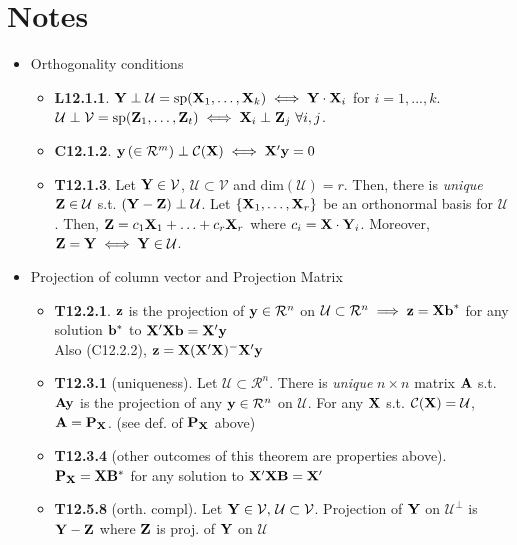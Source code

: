 \documentclass[a4paper, oneside]{book}
\begin{document}
\section*{Notes}
\begin{itemize}
\item Orthogonality conditions
	\begin{itemize}
	\item \textbf{L12.1.1}. $\mathbf{Y}\perp\mathcal{U}=\text{sp}(\mathbf{X}_1,\hdots,\mathbf{X}_k) \iff \mathbf{Y\cdot X}_i$ for $i=1,...,k$. $\mathcal{U\perp V}=\text{sp}(\mathbf{Z}_1,\hdots,\mathbf{Z}_t) \iff \mathbf{X}_i \perp \mathbf{Z}_j \,\,\forall i,j$.
	\item \textbf{C12.1.2}. $\mathbf{y}\, (\in \mathcal{R}^m) \perp \mathcal{C}(\mathbf{X}) \iff \mathbf{X}'\mathbf{y}=0$
	\item \textbf{T12.1.3}. Let $\mathbf{Y} \in \mathcal{V}$, $\mathcal{U}\subset \mathcal{V}$ and $\text{dim}(\mathcal{U})=r$. Then, there is \textit{unique} $\mathbf{Z} \in \mathcal{U}$ s.t. $(\mathbf{Y-Z})\perp \mathcal{U}$. Let $\{\mathbf{X}_1,\hdots,\mathbf{X}_r\}$ be an orthonormal basis for $\mathcal{U}$. Then, $\mathbf{Z}=c_1\mathbf{X}_1+\hdots+c_r\mathbf{X}_r$ where $c_i=\mathbf{X\cdot Y}_i$. Moreover, $\mathbf{Z=Y} \iff \mathbf{Y}\in\mathcal{U}$. 
	\end{itemize}
\item Projection of column vector and Projection Matrix
	\begin{itemize}
	\item \textbf{T12.2.1}. $\mathbf{z}$ is the projection of $\mathbf{y}\in\mathcal{R}^n$ on $\mathcal{U} \subset \mathcal{R}^n \implies \mathbf{z}=\mathbf{Xb}^*$ for any solution $\mathbf{b}^*$ to $\mathbf{X}'\mathbf{Xb}=\mathbf{X}'\mathbf{y}$ \\\hspace*{1.455cm} Also (C12.2.2), $\mathbf{z}=\mathbf{X}(\mathbf{X}'\mathbf{X})^-\mathbf{X}'\mathbf{y}$ 
	\item \textbf{T12.3.1} (uniqueness). Let $\mathcal{U} \subset \mathcal{R}^n$. There is \textit{unique} $n\times n$ matrix $\mathbf{A}$ s.t. $\mathbf{Ay}$ is the projection of any $\mathbf{y} \in \mathcal{R}^n$ on $\mathcal{U}$. For any $\mathbf{X}$ s.t. $\mathcal{C}(\mathbf{X})=\mathcal{U}$, $\mathbf{A}=\mathbf{P}_\mathbf{X}$. (see def. of $\mathbf{P}_\mathbf{X}$ above)
	\item \textbf{T12.3.4} (other outcomes of this theorem are properties above). $\mathbf{P}_\mathbf{X}=\mathbf{X}\mathbf{B}^*$ for any solution to $\mathbf{X}'\mathbf{XB}=\mathbf{X}'$
	\item \textbf{T12.5.8} (orth. compl). Let $\mathbf{Y}\in\mathcal{V},\, \mathcal{U}\subset\mathcal{V}$. Projection of $\mathbf{Y}$ on $\mathcal{U}^\perp$ is $\mathbf{Y-Z}$ where $\mathbf{Z}$ is proj. of $\mathbf{Y}$ on $\mathcal{U}$

\end{itemize}
\end{itemize}
\end{document}
